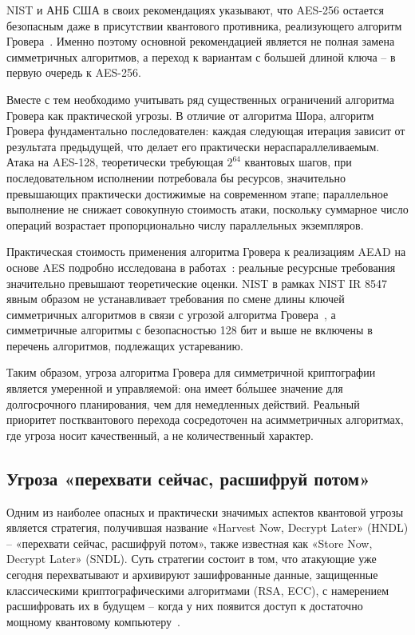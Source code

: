 \documentclass{itmo-vkr}
\begin{document}
	NIST и АНБ США в своих рекомендациях указывают, что AES-256 остается безопасным даже в присутствии квантового противника, реализующего алгоритм Гровера~\cite{nist-ir8547}. Именно поэтому основной рекомендацией является не полная замена симметричных алгоритмов, а переход к вариантам с большей длиной ключа -- в первую очередь к AES-256.
	
	Вместе с тем необходимо учитывать ряд существенных ограничений алгоритма Гровера как практической угрозы. В отличие от алгоритма Шора, алгоритм Гровера фундаментально последователен: каждая следующая итерация зависит от результата предыдущей, что делает его практически нераспараллеливаемым. Атака на AES-128, теоретически требующая $2^{64}$ квантовых шагов, при последовательном исполнении потребовала бы ресурсов, значительно превышающих практически достижимые на современном этапе; параллельное выполнение не снижает совокупную стоимость атаки, поскольку суммарное число операций возрастает пропорционально числу параллельных экземпляров.
	
	Практическая стоимость применения алгоритма Гровера к реализациям AEAD на основе AES подробно исследована в работах~\cite{saha2024grover,moiseyevsky2025saes}: реальные ресурсные требования значительно превышают теоретические оценки. NIST в рамках NIST IR 8547 явным образом не устанавливает требования по смене длины ключей симметричных алгоритмов в связи с угрозой алгоритма Гровера~\cite{nist-ir8547}, а симметричные алгоритмы с безопасностью 128 бит и выше не включены в перечень алгоритмов, подлежащих устареванию.
	
	Таким образом, угроза алгоритма Гровера для симметричной криптографии является умеренной и управляемой: она имеет бо́льшее значение для долгосрочного планирования, чем для немедленных действий. Реальный приоритет постквантового перехода сосредоточен на асимметричных алгоритмах, где угроза носит качественный, а не количественный характер.
	
	
	\subsection{Угроза «перехвати сейчас, расшифруй потом»}
	
	Одним из наиболее опасных и практически значимых аспектов квантовой угрозы является стратегия, получившая название «Harvest Now, Decrypt Later» (HNDL) -- «перехвати сейчас, расшифруй потом», также известная как «Store Now, Decrypt Later» (SNDL). Суть стратегии состоит в том, что атакующие уже сегодня перехватывают и архивируют зашифрованные данные, защищенные классическими криптографическими алгоритмами (RSA, ECC), с намерением расшифровать их в будущем -- когда у них появится доступ к достаточно мощному квантовому компьютеру~\cite{fedfed2025hndl}.
	
\end{document}
